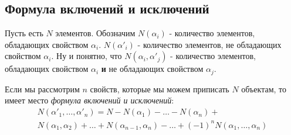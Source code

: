 \subsection{Формула включений и исключений}

Пусть есть $N$ элементов. Обозначим $N(\alpha_i)$ - количество элементов, обладающих свойством $\alpha_i$. $N(\alpha'_i)$ - количество элементов, не обладающих свойством $\alpha_i$. Ну и понятно, что $N(\alpha_i, \alpha'_j)$ - количество элементов, обладающих свойством $\alpha_i$ \textbf{и} не обладающих свойством $\alpha_j$.

\begin{theorem}
	Если мы рассмотрим $n$ свойств, которые мы можем приписать $N$ объектам, то имеет место \textit{формула включений и исключений}:
	\begin{multline*}
		N(\alpha'_1, \ldots, \alpha'_n) = N - N(\alpha_1) - \ldots - N(\alpha_n) + \\
		N(\alpha_1, \alpha_2) + \ldots + N(\alpha_{n - 1}, \alpha_n) - \ldots + (-1)^n N(\alpha_1, \ldots, \alpha_n)
	\end{multline*}
\end{theorem}

